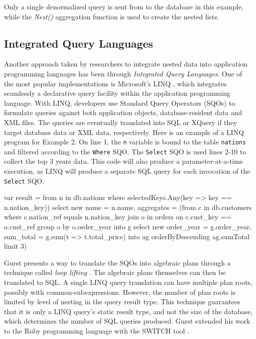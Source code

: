 Only a single denormalized query is sent from to the database in this example, while the \emph{Nest()} aggregation function is used to create the nested lists. 

\subsection{Integrated Query Languages}

Another approach taken by researchers to integrate nested data into application programming languages has been through \emph{Integrated Query Languages}. One of the most popular implementations is Microsoft's LINQ \cite{LINQ},  which integrates seamlessly a declarative query facility within the application programming language. With LINQ, developers use Standard Query Operators (SQOs) to formulate queries against both application objects, database-resident data and XML files. The queries are eventually translated into SQL or XQuery if they target database data or XML data, respectively. Here is an example of a LINQ program for Example 2. On line 1, the \texttt{n} variable is bound to the table \texttt{nations} and filtered according to the \texttt{Where} SQO. The \texttt{Select} SQO is used lines 2-10 to collect the top 3 years data. This code will also produce a parameter-at-a-time execution, as LINQ will produce a separate SQL query for each invocation of the \texttt{Select} SQO. 

\begin{SQL}
var result =
	from n in db.nations
	where selectedKeys.Any(key => key == n.nation_key))
	select new {
		name = n.name,
		aggregates = (from c in db.customers
		where c.nation_ref equals n.nation_key
		join o in orders on c.cust_key == o.cust_ref
		group o by o.order_year into g
		select new {
			order_year = g.order_year,
			sum_total = g.sum(t => t.total_price)} into ag
		orderByDescending ag.sumTotal
		limit 3)
	}
\end{SQL}

Gurst \cite{gurst:2010aa} presents a way to translate the SQOs into algebraic plans through a technique called \emph{loop lifting} \cite{gurst:2004aa, gurst:2009aa}. The algebraic plans themselves can then be translated to SQL. A single LINQ query translation can have multiple plan roots, possibly with common-subexpressions. However, the number of plan roots is limited by level of nesting in the query result type. This technique guarantees that it is only a LINQ query's static result type, and not the size of the database, which determines the number of SQL queries produced. Gurst extended his work to the Ruby programming language with the SWITCH tool \cite{gurst:2013aa}. 
